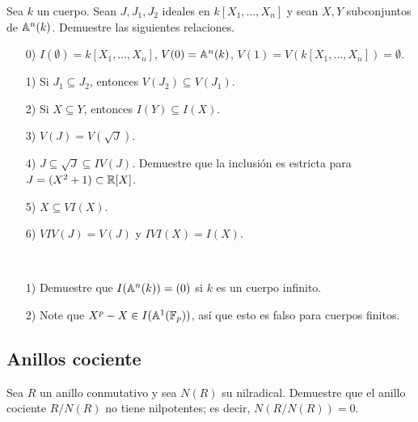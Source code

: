 \begin{ejercicio}[*]
  \label{ejerc:relaciones-para-I-y-V}
  Sea $k$ un cuerpo. Sean $J, J_1, J_2$ ideales en $k [X_1,\ldots,X_n]$ y sean
  $X,Y$ subconjuntos de $\AA^n (k)$. Demuestre las siguientes relaciones.

  \begin{enumerate}
  \item[0)] $I (\emptyset) = k [X_1,\ldots,X_n]$, $V (0) = \AA^n (k)$,
    $V (1) = V (k [X_1,\ldots,X_n]) = \emptyset$.

  \item[1)] Si $J_1 \subseteq J_2$, entonces $V (J_2) \subseteq V (J_1)$.

  \item[2)] Si $X\subseteq Y$, entonces $I (Y) \subseteq I (X)$.

  \item[3)] $V (J) = V (\sqrt{J})$.

  \item[4)] $J \subseteq \sqrt{J} \subseteq I V (J)$. Demuestre que la inclusión
    es estricta para $J = (X^2 + 1) \subset \RR [X]$.

  \item[5)] $X \subseteq V I (X)$.

  \item[6)] $VIV (J) = V (J)$ y $IVI (X) = I (X)$.
  \end{enumerate}
\end{ejercicio}

\begin{ejercicio}[**]
  \label{ejerc:IAn}
  ~

  \begin{enumerate}
  \item[1)] Demuestre que $I (\AA^n (k)) = (0)$ si $k$ es un cuerpo infinito.

  \item[2)] Note que $X^p - X \in I (\AA^1 (\FF_p))$, así que esto es falso para
    cuerpos finitos.
  \end{enumerate}
\end{ejercicio}

\subsection*{Anillos cociente}

\begin{ejercicio}
  Sea $R$ un anillo conmutativo y sea $N (R)$ su nilradical. Demuestre que
  el anillo cociente $R/N(R)$ no tiene nilpotentes; es decir,
  $N (R / N (R)) = 0$.
\end{ejercicio}

